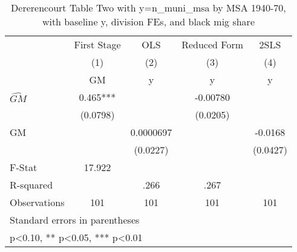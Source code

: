 \begin{table}[htbp]\centering
\def\sym#1{\ifmmode^{#1}\else\(^{#1}\)\fi}
\caption{Dererencourt Table Two with y=n\_muni\_msa by MSA 1940-70, with baseline y, division FEs, and black mig share}
\begin{tabular}{l*{4}{c}}
\toprule
                    & First Stage   &         OLS   &Reduced Form   &        2SLS   \\
                    &\multicolumn{1}{c}{(1)}&\multicolumn{1}{c}{(2)}&\multicolumn{1}{c}{(3)}&\multicolumn{1}{c}{(4)}\\
                    &\multicolumn{1}{c}{GM}&\multicolumn{1}{c}{y}&\multicolumn{1}{c}{y}&\multicolumn{1}{c}{y}\\
\midrule
$\hat{GM}$          &       0.465***&               &    -0.00780   &               \\
                    &    (0.0798)   &               &    (0.0205)   &               \\
\addlinespace
GM                  &               &   0.0000697   &               &     -0.0168   \\
                    &               &    (0.0227)   &               &    (0.0427)   \\
\midrule
F-Stat              &      17.922   &               &               &               \\
R-squared           &               &        .266   &        .267   &               \\
Observations        &         101   &         101   &         101   &         101   \\
\bottomrule
\multicolumn{5}{l}{\footnotesize Standard errors in parentheses}\\
\multicolumn{5}{l}{\footnotesize * p<0.10, ** p<0.05, *** p<0.01}\\
\end{tabular}
\end{table}
